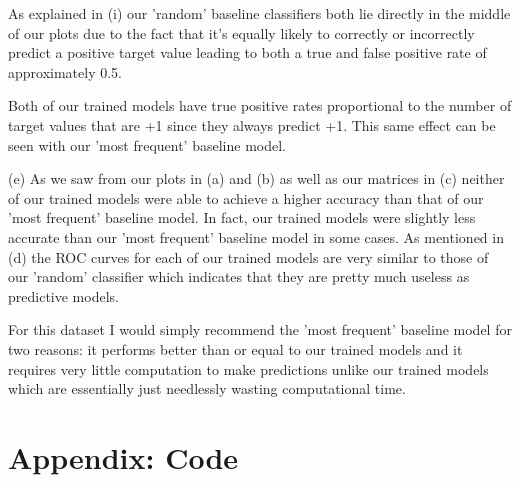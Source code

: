\documentclass[12pt]{article}
\begin{document}
As explained in (i) our 'random' baseline classifiers both lie directly in the middle of our plots due to the fact that it's equally likely to correctly or incorrectly predict a positive target value leading to both a true and false positive rate of approximately 0.5.

Both of our trained models have true positive rates proportional to the number of target values that are +1 since they always predict +1. This same effect can be seen with our 'most frequent' baseline model.

\noindent (e) As we saw from our plots in (a) and (b) as well as our matrices in (c) neither of our trained models were able to achieve a higher accuracy than that of our 'most frequent' baseline model. In fact, our trained models were slightly less accurate than our 'most frequent' baseline model in some cases. As mentioned in (d) the ROC curves for each of our trained models are very similar to those of our 'random' classifier which indicates that they are pretty much useless as predictive models.

For this dataset I would simply recommend the 'most frequent' baseline model for two reasons: it performs better than or equal to our trained models and it requires very little computation to make predictions unlike our trained models which are essentially just needlessly wasting computational time.

\section*{Appendix: Code}
\end{document}
